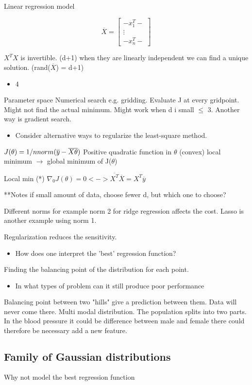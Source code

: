 \documentclass[a4paper]{article}
\begin{document}
Linear regression model

\begin{equation}
\overline{X} = \begin{bmatrix} -x_1^{T}- \\ \vdots \\ -x_n^{T}- \end{bmatrix}
\end{equation}

$X^{T}X$ is invertible. (d+1) when they are linearly independent we can find a unique solution. (rand($\overline{X}$) = d+1)

\begin{itemize}
	\item 4
\end{itemize}
Parameter space 
Numerical search e.g. gridding. Evaluate J at every gridpoint. Might not find the actual minimum. Might work when d i small $\le$ 3. Another way is gradient search. 

\begin{itemize}
	\item Consider alternative ways to regularize the least-square method.
\end{itemize}
$J(\theta) = 1/n norm( \overline{y} - \overline{X} \overline{\theta}) \\$
Positive quadratic function in $\theta$ (convex)
local minimum $\rightarrow$ global minimum of J($\theta$) 


Local min (*) $\nabla_0 J(\theta) = 0 <-> \overline{X^T} \overline{X} = X^{T} \overline{y} $


**Notes if small amount of data, choose fewer d, but which one to choose? 


Different norms for example norm 2 for ridge regression affects the cost. 
Lasso is another example using norm 1. 


Regularization reduces the sensitivity. 


\begin{itemize}
  	\item How does one interpret the 'best' regression function?
  \end{itemize}  

Finding the balancing point of the distribution for each point. 


\begin{itemize}
	\item In what types of problem can it still produce poor performance
\end{itemize}

Balancing point between two "hills" give a prediction between them. Data will never come there. Multi modal distribution. The population splits into two parts. In the blood pressure it could be difference between male and female there could therefore be necessary add a new feature. 


\subsection{Family of Gaussian distributions}
Why not model the best regression function




\end{document}
